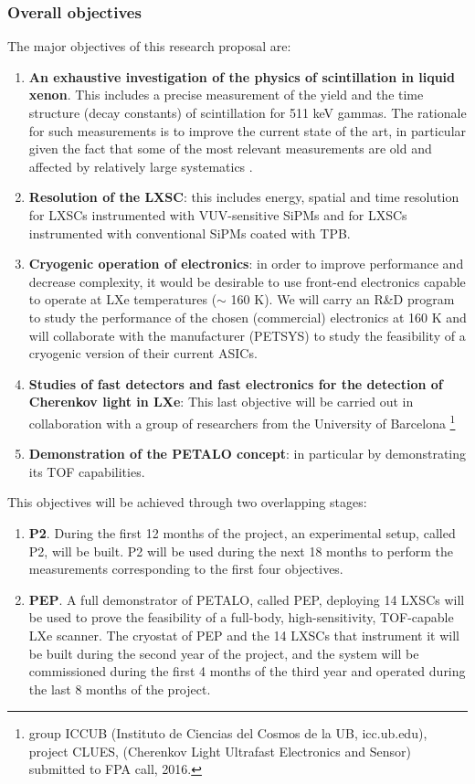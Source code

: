 \subsubsection*{Overall objectives}
The major objectives of this research proposal are: 
\begin{enumerate}
\item {\bf An exhaustive investigation of the physics of scintillation in liquid xenon}. This includes a precise measurement of the yield and the time structure (decay constants) of scintillation for 511 keV gammas. The rationale for such measurements is to improve the current state of the art, in particular given the fact that some of the most relevant measurements are old and affected by relatively large systematics \cite{Kubota79}. 
\item {\bf Resolution of the LXSC}: this includes energy, spatial and time resolution for LXSCs instrumented with VUV-sensitive SiPMs and for LXSCs instrumented with conventional SiPMs coated with TPB.
\item {\bf Cryogenic operation of electronics}: in order to improve performance and decrease complexity, it would be desirable to use front-end electronics capable to operate at LXe temperatures ($\sim$ 160 K). We will carry an R\&D program to study the performance of the chosen (commercial) electronics at 160 K and will collaborate with the manufacturer (PETSYS) to study the feasibility of a cryogenic version of their current ASICs. 
\item {\bf Studies of fast detectors and fast electronics for the detection of Cherenkov light in LXe}: This last objective will be carried out in collaboration with a group of researchers from the University of Barcelona \footnote{group ICCUB (Instituto de Ciencias del Cosmos de la UB, icc.ub.edu), project CLUES, (Cherenkov Light Ultrafast Electronics and Sensor) submitted to FPA call, 2016.}
\item {\bf Demonstration of the PETALO concept}: in particular by demonstrating its TOF capabilities.   
\end{enumerate}

This objectives will be achieved through two overlapping stages:

\begin{enumerate}
\item {\bf P2}. During the first  12 months of the project, an experimental setup, called P2, will be built. P2 will be used during the next 18 months to perform the measurements corresponding to the first four objectives.  
\item {\bf PEP}. A full demonstrator of PETALO, called PEP, deploying 14 LXSCs will be used to prove the feasibility of a full-body, high-sensitivity, TOF-capable LXe scanner. The cryostat of PEP and the 14 LXSCs that instrument it will be built during the second year of the project, and the system will be commissioned during the first 4 months of the third year and operated during the last 8 months of the project.   
\end{enumerate}

